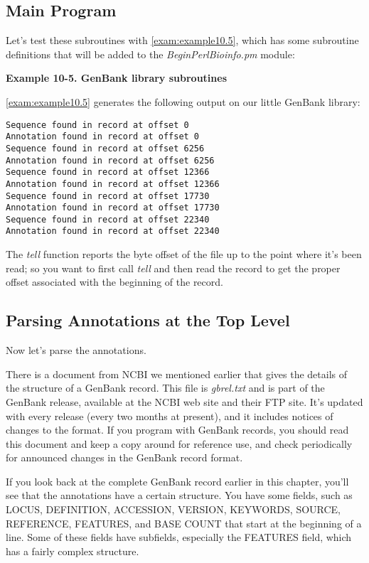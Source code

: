 \subsection{Main Program}
Let's test these subroutines with \autoref{exam:example10.5}, which has some subroutine definitions that will be added to the \textit{BeginPerlBioinfo.pm} module: 
  
\textbf{Example 10-5. GenBank library subroutines}


\autoref{exam:example10.5} generates the following output on our little GenBank library:

\begin{lstlisting}
Sequence found in record at offset 0
Annotation found in record at offset 0
Sequence found in record at offset 6256
Annotation found in record at offset 6256
Sequence found in record at offset 12366
Annotation found in record at offset 12366
Sequence found in record at offset 17730
Annotation found in record at offset 17730
Sequence found in record at offset 22340
Annotation found in record at offset 22340
\end{lstlisting}

The \textit{tell} function reports the byte offset of the file up to the point where it's been read; so you want to first call \textit{tell} and then read the record to get the proper offset associated with the beginning of the record. 

\subsection{Parsing Annotations at the Top Level}
Now let's parse the annotations.

There is a document from NCBI we mentioned earlier that gives the details of the structure of a GenBank record. This file is \textit{gbrel.txt} and is part of the GenBank release, available at the NCBI web site and their FTP site. It's updated with every release (every two months at present), and it includes notices of changes to the format. If you program with GenBank records, you should read this document and keep a copy around for reference use, and check periodically for announced changes in the GenBank record format.

If you look back at the complete GenBank record earlier in this chapter, you'll see that the annotations have a certain structure. You have some fields, such as LOCUS, DEFINITION, ACCESSION, VERSION, KEYWORDS, SOURCE, REFERENCE, FEATURES, and BASE COUNT that start at the beginning of a line. Some of these fields have subfields, especially the FEATURES field, which has a fairly complex structure.

